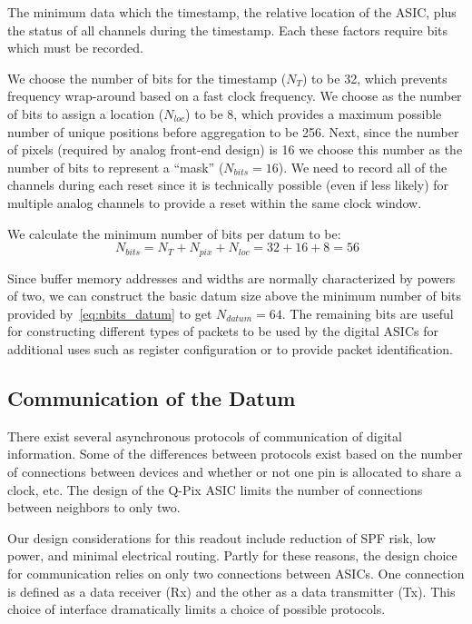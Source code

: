 The minimum data which the timestamp, the relative location of the ASIC, plus the status of all channels during the timestamp.
Each these factors require bits which must be recorded.

We choose the number of bits for the timestamp ($N_{T}$) to be 32, which prevents frequency wrap-around based on a fast clock frequency.
We choose as the number of bits to assign a location ($N_{loc}$) to be 8, which provides a maximum possible number of unique positions before aggregation to be 256.
Next, since the number of pixels (required by analog front-end design) is 16 we choose this number as the number of bits to represent a ``mask'' ($N_{bits} = 16$).
We need to record all of the channels during each reset since it is technically possible (even if less likely) for multiple analog channels to provide a reset within the same clock window.

We calculate the minimum number of bits per datum to be:
\begin{equation}~\label{eq:nbits_datum}
  N_{bits} = N_{T} + N_{pix} + N_{loc} = 32 + 16 + 8 = 56
\end{equation}

Since buffer memory addresses and widths are normally characterized by powers of two, we can construct the basic datum size above the minimum number of bits provided by~\ref{eq:nbits_datum} to get $N_{datum} = 64$.
The remaining bits are useful for constructing different types of packets to be used by the digital ASICs for additional uses such as register configuration or to provide packet identification.

\subsection{Communication of the Datum}\label{sec:comms}
There exist several asynchronous protocols of communication of digital information.
Some of the differences between protocols exist based on the number of connections between devices and whether or not one pin is allocated to share a clock, etc.
The design of the Q-Pix ASIC limits the number of connections between neighbors to only two.

Our design considerations for this readout include reduction of SPF risk, low power, and minimal electrical routing.
Partly for these reasons, the design choice for communication relies on only two connections between ASICs.
One connection is defined as a data receiver (Rx) and the other as a data transmitter (Tx).
This choice of interface dramatically limits a choice of possible protocols.

